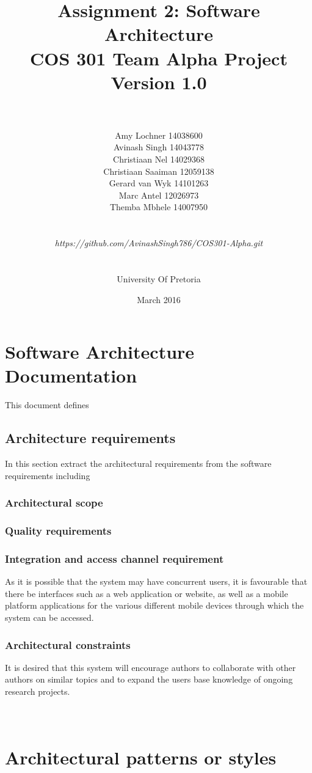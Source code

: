 \documentclass[a4paper]{article}
\title{\huge Assignment 2: Software Architecture
	\\COS 301 Team Alpha Project
	\\Version 1.0}
\author{\\\\Amy Lochner 14038600\\ Avinash Singh 14043778 \\
	Christiaan Nel 14029368\\ Christiaan Saaiman 12059138 \\
	Gerard van Wyk 14101263\\ Marc Antel 12026973\\
	Themba Mbhele 14007950
	\\
	\\
	\\\textit{https://github.com/AvinashSingh786/COS301-Alpha.git}
	\\
	\\
	\\ University Of Pretoria\\}
\date{March 2016}
\begin{document}
	
	\maketitle

	\newpage

	\tableofcontents
	\newpage
	
	\section{Software Architecture Documentation}
	
	This document defines 
	
	\subsection{Architecture requirements}
In this section extract the architectural requirements from the software requirements including

	\subsubsection{Architectural scope}
	\subsubsection{Quality requirements}

	\subsubsection{Integration and access channel requirement}
		As it is possible that the system may have concurrent users, it is favourable that there be interfaces such as a web application or website, as well as a mobile platform applications for the various different mobile devices through which the system can be accessed.
		\\
	\subsubsection{Architectural constraints}
	It is desired that this system will encourage authors to collaborate with other authors on similar topics and to expand the users base knowledge of ongoing research projects.
	\\
	\\
	\\
	
	
	\section{Architectural patterns or styles}
\end{document}
